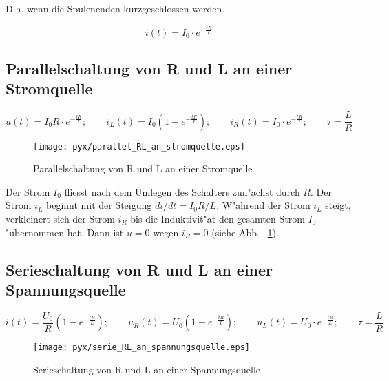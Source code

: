 \documentclass[german, 10pt, a4paper, headsepline]{scrreprt}
\theoremstyle{remark}
\begin{document}
D.h. wenn die Spulenenden kurzgeschlossen werden.

\begin{displaymath}
	i(t) = I_0 \cdotp e^{-\frac{tR}{L}}
\end{displaymath}

\subsection{Parallelschaltung von R und L an einer Stromquelle}

\begin{displaymath}
	u(t)=I_0R\cdotp e^{-\frac{tR}{L}};\qquad i_L(t)=I_0(1-e^{-\frac{tR}{L}});\qquad i_R(t) = I_0\cdotp e^{-\frac{tR}{L}}; \qquad \tau =\frac{L}{R}
\end{displaymath}

\begin{figure}[hbt]
 \begin{center}
	\texttt{[image: pyx/parallel\_RL\_an\_stromquelle.eps]}
 \end{center}
 \caption{Parallelschaltung von R und L an einer Stromquelle}
 \label{parallel_RL_an_stromquelle}
\end{figure}

Der Strom $I_0$ fliesst nach dem Umlegen des Schalters zun"achst durch $R$. Der Strom $i_L$ beginnt mit der Steigung $di/dt=I_0R/L$. W"ahrend der Strom $i_L$ steigt, verkleinert sich der Strom $i_R$ bis die Induktivit"at den gesamten Strom $I_0$ "ubernommen hat. Dann ist $u=0$ wegen $i_R=0$ (siehe Abb. ~\ref{parallel_RL_an_stromquelle}).

\subsection{Serieschaltung von R und L an einer Spannungsquelle}

\begin{displaymath}
	i(t) = \frac{U_0}{R}(1-e^{-\frac{tR}{L}});\qquad u_R(t) = U_0(1-e^{-\frac{tR}{L}});\qquad u_L(t) = U_0\cdotp e^{-\frac{tR}{L}};\qquad \tau = \frac{L}{R}
\end{displaymath}

\begin{figure}[hbt]
 \begin{center}
	\texttt{[image: pyx/serie\_RL\_an\_spannungsquelle.eps]}
 \end{center}
 \caption{Serieschaltung von R und L an einer Spannungsquelle}
 \label{serie_RL_an_spannungsquelle}
\end{figure}
\end{document}
